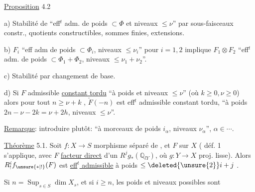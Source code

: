 
\uline{Proposition} 4.2 

a) Stabilité de ``eff$^{t}$ adm. de poids $\subset\Phi$ et niveaux $\leq\nu$'' par sous-faisceaux constr., quotients constructibles, sommes finies, extensions.

b) $F_i$ ``eff adm de poids $\subset\Phi_i$, niveaux $\leq\nu_i$'' pour $i=1,2$ implique $F_1\otimes F_2$ ``eff$^{t}$ adm. de poids $\subset\Phi_1+\Phi_2$, niveaux $\leq\nu_1+\nu_2$''.

c) Stabilité par changement de base.

d) Si $F$  admissible \uline{constant tordu} ``à poids  et niveaux $\leq\nu$'' (où $k\geq0,\nu\geq0$)  alors pour tout $n\geq\nu+k$ , $\check F(-n)$ est eff$^{t}$ admissible constant tordu, ``à poids $2n-\nu-2k=\nu+2h$, niveaux $\leq\nu$''.

\uline{Remarque}: introduire plutôt: ``à morceaux de poids $i_\alpha$, niveaux $\nu_\alpha$'', $\alpha\in\cdots$.

\uline{Théorème} 5.1. Soit $f:X\longrightarrow S$ morphisme séparé de  , et $F$ sur $X$     ( déf. 1  s'applique, avec $F$ \uline{facteur direct} d'un $R^j g_*(\mathbb Q_{lY})$, où $g:Y\longrightarrow X$  proj. lisse). Alors $R^i_!f_{\unsure{*|!}}(F)$ est \uline{eff$^{t}$ admissible}  à  poids $\leq\deleted{\unsure{2}}i+j$  .

Si $n=\operatorname{Sup}_{s\in S}\dim X_s$,  et si $i\geq n$, les poids  et niveaux  possibles sont

